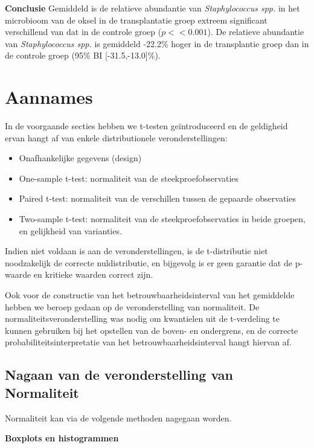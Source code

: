\documentclass[
  12pt,dutch]{book}
\providecommand{\tightlist}{%
  \setlength{\itemsep}{0pt}\setlength{\parskip}{0pt}}
\theoremstyle{definition}
\theoremstyle{definition}
\theoremstyle{definition}
\theoremstyle{definition}
\theoremstyle{remark}
\begin{document}
\textbf{Conclusie}
Gemiddeld is de relatieve abundantie van \emph{Staphylococcus spp.} in het microbioom van de oksel in de transplantatie groep extreem significant verschillend van dat in de controle groep (\(p<<0.001\)). De relatieve abundantie van \emph{Staphylococcus spp.} is gemiddeld -22.2\% hoger in de transplantie groep dan in de controle groep (95\% BI {[}-31.5,-13.0{]}\%).

\section{Aannames}\label{aannames}

In de voorgaande secties hebben we t-testen geïntroduceerd en de geldigheid ervan hangt af van enkele distributionele veronderstellingen:

\begin{itemize}
\tightlist
\item
  Onafhankelijke gegevens (design)
\item
  One-sample t-test: normaliteit van de steekproefobservaties
\item
  Paired t-test: normaliteit van de verschillen tussen de gepaarde observaties
\item
  Two-sample t-test: normaliteit van de steekproefobservaties in beide groepen, en gelijkheid van varianties.
\end{itemize}

Indien niet voldaan is aan de veronderstellingen, is de t-distributie niet noodzakelijk de correcte nuldistributie, en bijgevolg is er geen garantie dat de p-waarde en kritieke waarden correct zijn.

Ook voor de constructie van het betrouwbaarheidsinterval van het gemiddelde hebben we beroep gedaan op de veronderstelling van normaliteit. De normaliteitsveronderstelling was nodig om kwantielen uit de t-verdeling te kunnen gebruiken bij het opstellen van de boven- en ondergrens, en de correcte probabiliteitsinterpretatie van het betrouwbaarheidsinterval hangt hiervan af.

\subsection{Nagaan van de veronderstelling van Normaliteit}\label{nagaan-van-de-veronderstelling-van-normaliteit}

Normaliteit kan via de volgende methoden nagegaan worden.

\textbf{Boxplots en histogrammen}
\end{document}
